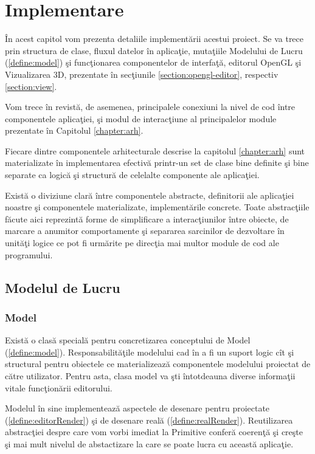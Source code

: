 \chapter{Implementare}
\label{chapter:impl}

În acest capitol vom prezenta detaliile implementării acestui proiect. Se va 
trece prin structura de clase, fluxul datelor în aplicaţie, mutaţiile Modelului 
de Lucru (\ref{define:model})  şi funcţionarea componentelor de interfaţă, 
editorul OpenGL şi Vizualizarea 3D, prezentate în secţiunile 
\ref{section:opengl-editor}, respectiv \ref{section:view}.

Vom trece în revistă, de asemenea, principalele conexiuni la nivel de cod între 
componentele aplicaţiei, şi modul de interacţiune al principalelor module 
prezentate în Capitolul \ref{chapter:arh}.

Fiecare dintre componentele arhitecturale descrise la capitolul 
\ref{chapter:arh} sunt materializate în implementarea efectivă printr-un set de 
clase bine definite şi bine separate ca logică şi structură de celelalte 
componente ale aplicaţiei.

Există o diviziune clară între componentele abstracte, definitorii ale 
aplicaţiei noastre şi componentele materializate, implementările concrete. 
Toate abstracţiile făcute aici reprezintă forme de simplificare a 
interacţiunilor între obiecte, de marcare a anumitor comportamente şi separarea 
sarcinilor de dezvoltare în unităţi logice ce pot fi urmărite pe direcţia mai 
multor module de cod ale programului.

\section{Modelul de Lucru}

\subsection{Model}
Există o clasă specială pentru concretizarea conceptului de Model 
(\ref{define:model}). Responsabilităţile modelului cad în a fi un suport logic 
cît şi structural pentru obiectele ce materializează componentele modelului 
proiectat de către utilizator. Pentru asta, clasa model va şti întotdeauna 
diverse informaţii vitale funcţionării editorului.

Modelul în sine implementează aspectele de desenare pentru proiectate 
(\ref{define:editorRender}) şi de desenare reală (\ref{define:realRender}). 
Reutilizarea abstracţiei despre care vom vorbi imediat la Primitive conferă 
coerenţă şi creşte şi mai mult nivelul de abstactizare la care se poate lucra 
cu această aplicaţie.

